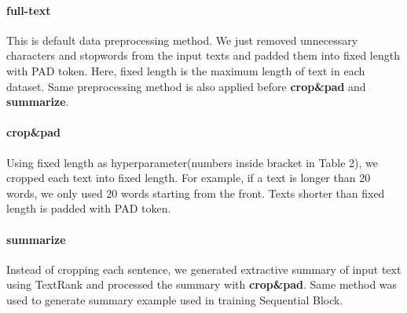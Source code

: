 \documentclass{article}
\begin{document}
\paragraph{full-text}
This is default data preprocessing method. We just removed unnecessary characters and stopwords from the input texts and padded them into fixed length with PAD token. Here, fixed length is the maximum length of text in each dataset. Same preprocessing method is also applied before \textbf{crop\&pad} and \textbf{summarize}.
\paragraph{crop\&pad}
Using fixed length as hyperparameter(numbers inside bracket in Table 2), we cropped each text into fixed length. For example, if a text is longer than 20 words, we only used 20 words starting from the front. Texts shorter than fixed length is padded with PAD token.
\paragraph{summarize}
Instead of cropping each sentence, we generated extractive summary of input text using TextRank\cite{mihalcea-tarau:2004:EMNLP} and processed the summary with \textbf{crop\&pad}. Same method was used to generate summary example used in training Sequential Block.  
\end{document}
